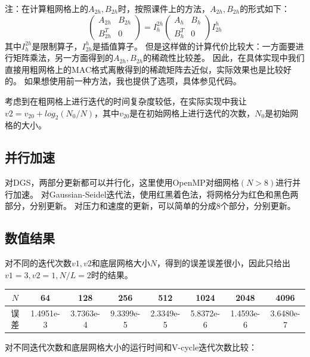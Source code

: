 \documentclass{article}
\begin{document}
注：在计算粗网格上的$A_{2h},B_{2h}$时，按照课件上的方法，$A_{2h},B_{2h}$的形式如下：
\begin{equation*}
  \begin{pmatrix}
    A_{2h} & B_{2h} \\
    B_{2h}^{T} & 0
  \end{pmatrix}
  =
  I_{h}^{2h}
  \begin{pmatrix}
    A_h & B_h \\
    B_h^{T} & 0
  \end{pmatrix}
  I_{2h}^{h}
\end{equation*}
其中$I_{h}^{2h}$是限制算子，$I_{2h}^{h}$是插值算子。
但是这样做的计算代价比较大：一方面要进行矩阵乘法，另一方面得到的$A_{2h},B_{2h}$的稀疏性比较差。
因此，在具体实现中我们直接用粗网格上的MAC格式离散得到的稀疏矩阵去近似，实际效果也是比较好的。
如果想使用前一种方法，我也提供了选项，具体参见代码。

考虑到在粗网格上进行迭代的时间复杂度较低，在实际实现中我让$v2 = v_{20} + log_2(N_0/N)$，其中$v_{20}$是在初始网格上进行迭代的次数，$N_0$是初始网格的大小。

\subsection{并行加速}

对DGS，两部分更新都可以并行化，这里使用OpenMP对细网格$(N>8)$进行并行加速。
对Gaussian-Seidel迭代法，使用红黑着色法，将网格分为红色和黑色两部分，分别更新。
对压力和速度的更新，可以简单的分成8个部分，分别更新。

\subsection{数值结果}
对不同的迭代次数$v1,v2$和底层网格大小$N$，得到的误差误差很小，因此只给出$v1 = 3, v2 = 1, N/L = 2$时的结果。

\begin{table}[!h]
  \centering
  \begin{tabular}{cccccccc}
    \toprule
    $N$ & 64 & 128 & 256 & 512 & 1024 & 2048 & 4096 \\
    \midrule
    误差 & 1.4951e-3 & 3.7363e-4 & 9.3399e-5 & 2.3349e-5 & 5.8372e-6 & 1.4593e-6 & 3.6480e-7 \\
    \bottomrule
  \end{tabular}
\end{table}


对不同迭代次数和底层网格大小的运行时间和V-cycle迭代次数比较：
\end{document}
